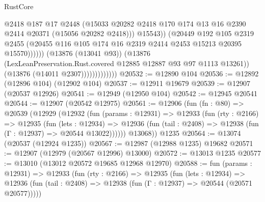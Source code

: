 \begin{lexlean}{RustCore}
\begin{coremodule}
                                        @2418
                                        @187
                                        @17
                                        @2448
                                        (@15033
                                          @20282
                                          @2418
                                          @170
                                          @174
                                          @13
                                          @16
                                          @2390
                                          @2414
                                          @20371
                                          (@15056 @20282 @2418)))
                                      @15543))
                                  (@20449
                                    @192
                                    @105
                                    @2319
                                    @2455
                                    (@20455
                                      @116
                                      @105
                                      @174
                                      @16
                                      @2319
                                      @2414
                                      @2453
                                      @15213
                                      @20395
                                      @15570))))))
                          (@13876 (@13041 @93))
                          (@13876
                            (LexLeanPreservation.Rust.covered @12885 @12887 @93 @97 @1113 @13261))
                          (@13876 (@14011 @2307)))))))))))))
@20532 := @12890 @104
@20536 := @12892 (@12896 @104) (@12902 @104)
@20537 := @12911 @19679
@20539 := @12907 (@20537 @12926)
@20541 := @12949 (@12950 @104)
@20542 := @12945 @20541
@20544 := @12907 (@20542 @12975)
@20561 := @12906
    (fun (fn : @80) =>
    @20539
      (@12929
        (@12932
          (fun (params : @12931) =>
          @12933
            (fun (rty : @2166) =>
            @12935
              (fun (lets : @12934) =>
              @12936 (fun (tail : @2408) => @12938 (fun (Γ : @12937) => @20544 @13022))))))
        @13068))
    @1235
@20564 := @13074 (@20537 (@12924 @1235))
@20567 := @12987 (@12988 @1235) @19682
@20571 := @12907 (@12979 (@20567 @12996) @13000)
@20572 := @13013 @1235
@20577 := @13010 (@13012 @20572 @19685 @12968 @12970)
@20588 := fun (params : @12931) =>
  @12933
    (fun (rty : @2166) =>
    @12935
      (fun (lets : @12934) =>
      @12936 (fun (tail : @2408) => @12938 (fun (Γ : @12937) => @20544 (@20571 @20577)))))

\end{coremodule}
\end{lexlean}
